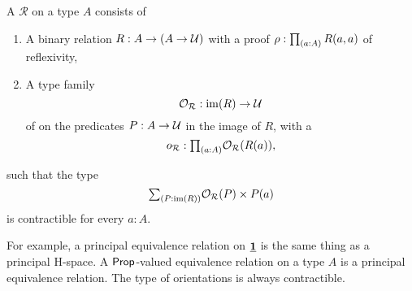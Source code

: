 \documentclass[reqno]{amsart}
\begin{document}
\begin{defn}
A  $\mathcal{R}$ on a type $A$ consists of
\begin{enumerate}
\item A binary relation $R:A\to (A\to \mathcal{U})$ with a proof $\rho:\prd{a:A}R(a,a)$ of reflexivity,
\item A type family
\begin{equation*}
\mathcal{O}_\mathcal{R} : \operatorname{im}(R)\to\mathcal{U} \\
\end{equation*}
of  on the predicates $P:A\to \mathcal{U}$ in the image of $R$, with a 
\begin{equation*}
o_{\mathcal{R}} : \prd{a:A}\mathcal{O}_{\mathcal{R}}(R(a)),
\end{equation*}
\end{enumerate}
such that the type
\begin{equation*}
\sm{P:\im(R)}\mathcal{O}_{\mathcal{R}}(P)\times P(a)
\end{equation*}
is contractible for every $a:A$. 
\end{defn}

For example, a principal equivalence relation on $\underline{\mathbf{1}}$ is the same thing as a principal H-space. 
A $\mathsf{Prop}$-valued equivalence relation on a type $A$ is a principal equivalence relation. The type of orientations is always contractible.
\end{document}
